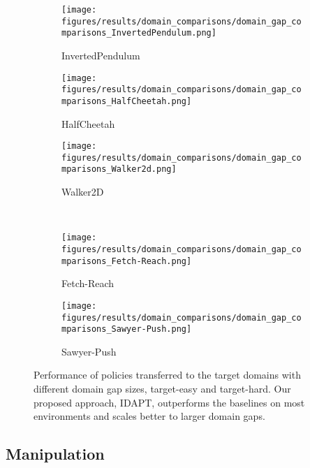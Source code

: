 \begin{figure*}[t]
    \centering
    \begin{subfigure}[t]{0.3\linewidth}
        \texttt{[image: figures/results/domain\_comparisons/domain\_gap\_comparisons\_InvertedPendulum.png]}
        \caption{InvertedPendulum}
        \label{fig:result_all:invertedpendulum}
    \end{subfigure}
    \begin{subfigure}[t]{0.3\linewidth}
        \texttt{[image: figures/results/domain\_comparisons/domain\_gap\_comparisons\_HalfCheetah.png]}
        \caption{HalfCheetah}
        \label{fig:result_all:halfcheetah}
    \end{subfigure}
    \begin{subfigure}[t]{0.3\linewidth}
        \texttt{[image: figures/results/domain\_comparisons/domain\_gap\_comparisons\_Walker2d.png]}
        \caption{Walker2D}
        \label{fig:result_all:walker2d}
    \end{subfigure}
    \\
    \begin{subfigure}[t]{0.3\linewidth}
        \texttt{[image: figures/results/domain\_comparisons/domain\_gap\_comparisons\_Fetch-Reach.png]}
        \caption{Fetch-Reach}
        \label{fig:result_all:fetch_reach}
    \end{subfigure}
    \begin{subfigure}[t]{0.3\linewidth}
        \texttt{[image: figures/results/domain\_comparisons/domain\_gap\_comparisons\_Sawyer-Push.png]}
        \caption{Sawyer-Push}
        \label{fig:result_all:sawyer_push}
    \end{subfigure}
    \begin{subfigure}[t]{0.29\linewidth}
        \centering
        \hspace{-5mm}
    \end{subfigure}
    \caption{
        Performance of policies transferred to the target domains with different domain gap sizes, target-easy and target-hard. Our proposed approach, IDAPT, outperforms the baselines on most environments and scales better to larger domain gaps.
    }
\label{fig:domain_exps}
\end{figure*}


\subsection{Manipulation}

